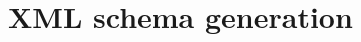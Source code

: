 \documentclass{acm_proc_article-sp}
\begin{document}
%

\section{XML schema generation}





  
\end{document}
